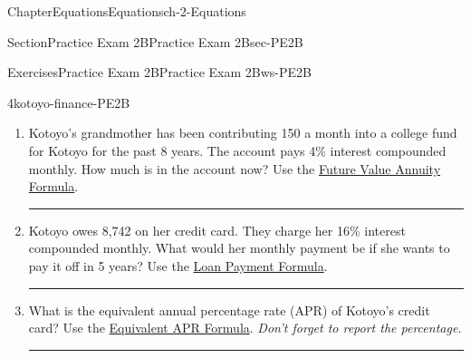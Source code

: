 \documentclass[twoside,11pt,]{book}
\newlength{\workspacestrutwidth}
\numberwithin{equation}{section}
\begin{document}
\begin{chapterptx}{Chapter}{Equations}{}{Equations}{}{}{ch-2-Equations}
\begin{sectionptx}{Section}{Practice Exam 2B}{}{Practice Exam 2B}{}{}{sec-PE2B}
\begin{exercises-subsection-numberless}{Exercises}{Practice Exam 2B}{}{Practice Exam 2B}{}{}{ws-PE2B}
\begin{divisionexercise}{4}{}{}{kotoyo-finance-PE2B}
\begin{enumerate}[label=(\alph*),ref=\alph*]
\par\rule{\workspacestrutwidth}{1in}%
\item{}Kotoyo's grandmother has been contributing \textdollar{}150 a month into a college fund for Kotoyo for the past 8 years. The account pays 4\% interest compounded monthly. How much is in the account now? Use the \hyperref[future-value-annuity-formula]{Future Value Annuity Formula}.%
\par\rule{\workspacestrutwidth}{1in}%
\item{}Kotoyo owes \textdollar{}8,742 on her credit card. They charge her 16\% interest compounded monthly. What would her monthly payment be if she wants to pay it off in 5 years? Use the \hyperref[loan-payment-formula]{Loan Payment Formula}.%
\par\rule{\workspacestrutwidth}{1in}%
\item{}What is the equivalent annual percentage rate (APR) of Kotoyo's credit card? Use the \hyperref[equivalent-apr-formula]{Equivalent APR Formula}. \emph{Don't forget to report the percentage.}%
\par\rule{\workspacestrutwidth}{0in}%
\end{enumerate}%
\end{divisionexercise}%
\end{exercises-subsection-numberless}
\end{sectionptx}
\end{chapterptx}
%
%
\typeout{************************************************}
\typeout{************************************************}
%
\end{document}
